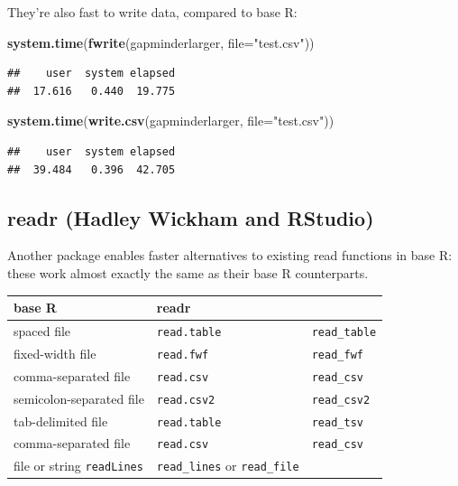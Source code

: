 \documentclass[]{article}
\newenvironment{Shaded}{\begin{snugshade}}{\end{snugshade}}
\newcommand{\KeywordTok}[1]{\textcolor[rgb]{0.13,0.29,0.53}{\textbf{{#1}}}}
\newcommand{\DataTypeTok}[1]{\textcolor[rgb]{0.13,0.29,0.53}{{#1}}}
\newcommand{\StringTok}[1]{\textcolor[rgb]{0.31,0.60,0.02}{{#1}}}
\newcommand{\NormalTok}[1]{{#1}}
\begin{document}
They're also fast to write data, compared to base R:

\begin{Shaded}
\begin{Highlighting}[]
\KeywordTok{system.time}\NormalTok{(}\KeywordTok{fwrite}\NormalTok{(gapminderlarger, }\DataTypeTok{file=}\StringTok{"test.csv"}\NormalTok{))}
\end{Highlighting}
\end{Shaded}

\begin{verbatim}
##    user  system elapsed 
##  17.616   0.440  19.775
\end{verbatim}

\begin{Shaded}
\begin{Highlighting}[]
\KeywordTok{system.time}\NormalTok{(}\KeywordTok{write.csv}\NormalTok{(gapminderlarger, }\DataTypeTok{file=}\StringTok{"test.csv"}\NormalTok{))}
\end{Highlighting}
\end{Shaded}

\begin{verbatim}
##    user  system elapsed 
##  39.484   0.396  42.705
\end{verbatim}

\subsection{readr (Hadley Wickham and
RStudio)}\label{readr-hadley-wickham-and-rstudio}

Another package enables faster alternatives to existing read functions
in base R: these work almost exactly the same as their base R
counterparts.

\begin{longtable}[c]{@{}lll@{}}
\toprule
\textbf{base R} & \textbf{readr}\tabularnewline
\midrule
\endhead
spaced file & \texttt{read.table} & \texttt{read\_table}\tabularnewline
fixed-width file & \texttt{read.fwf} & \texttt{read\_fwf}\tabularnewline
comma-separated file & \texttt{read.csv} &
\texttt{read\_csv}\tabularnewline
semicolon-separated file & \texttt{read.csv2} &
\texttt{read\_csv2}\tabularnewline
tab-delimited file & \texttt{read.table} &
\texttt{read\_tsv}\tabularnewline
comma-separated file & \texttt{read.csv} &
\texttt{read\_csv}\tabularnewline
file or string \texttt{readLines} & \texttt{read\_lines} or
\texttt{read\_file}\tabularnewline
\bottomrule
\end{longtable}
\end{document}
